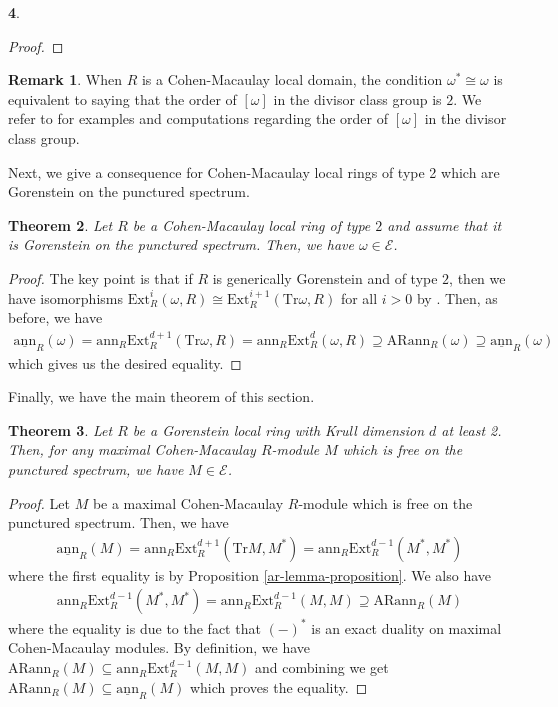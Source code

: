 \documentclass[12pt]{amsart}
\newcommand{\Ext}{\mathrm{Ext}}
\newcommand{\ann}{\mathrm{ann}}
\newcommand{\sann}{\underline{\mathrm{ann}}}
\newcommand{\arann}{\mathrm{ARann}}
\newcommand{\EE}{\mathcal{E}}
\newtheorem{theorem}{Theorem}[section]
\theoremstyle{definition}
\newtheorem{remark}[theorem]{Remark}
\newtheorem{chunk}[theorem]{}
\numberwithin{equation}{theorem}
\newcommand{\Tr}{\mathrm{Tr}}
\begin{document}
\begin{chunk}
\begin{proof}
\end{proof}
\begin{remark}
    When $R$ is a Cohen-Macaulay local domain, the condition $\omega^* \cong \omega$ is equivalent to saying that the order of $[\omega]$ in the divisor class group is $2$. We refer to \cite{Weston} for examples and computations regarding the order of $[\omega]$ in the divisor class group.
\end{remark}
Next, we give a consequence for Cohen-Macaulay local rings of type 2 which are Gorenstein on the punctured spectrum.
\begin{theorem}\label{type-2-theorem}
    Let $R$ be a Cohen-Macaulay local ring of type $2$ and assume that it is Gorenstein on the punctured spectrum. Then, we have $\omega \in \EE$.
\end{theorem}
\begin{proof}
    The key point is that if $R$ is generically Gorenstein and of type $2$, then we have isomorphisms $\Ext_R^i(\omega, R) \cong \Ext_R^{i+1}(\Tr \omega, R)$ for all $i > 0$ by \cite[Lemma 4.1]{Dao-Kobayashi-Takahashi}. Then, as before, we have
    \begin{align*}
        \sann_R(\omega) = \ann_R\Ext_R^{d+1}(\Tr \omega, R) = \ann_R \Ext_R^d(\omega, R) \supseteq \arann_R(\omega) \supseteq \sann_R(\omega) 
    \end{align*}
    which gives us the desired equality.
\end{proof}
Finally, we have the main theorem of this section.
\begin{theorem}
    Let $R$ be a Gorenstein local ring with Krull dimension $d$ at least 2. Then, for any maximal Cohen-Macaulay $R$-module $M$ which is free on the punctured spectrum, we have $M \in \EE$.
\end{theorem}
\begin{proof}
    Let $M$ be a maximal Cohen-Macaulay $R$-module which is free on the punctured spectrum. Then, we have 
    \begin{align*}
        \sann_R(M) = \ann_R \Ext_R^{d+1}(\Tr M, M^*) = \ann_R \Ext_R^{d-1}(M^*,M^*)
    \end{align*}
    where the first equality is by Proposition \ref{ar-lemma-proposition}. We also have 
    \begin{align*}
        \ann_R \Ext_R^{d-1}(M^*,M^*) = \ann_R \Ext_R^{d-1}(M,M) \supseteq \arann_R(M)
    \end{align*}
     where the equality is due to the fact that $(-)^*$ is an exact duality on maximal Cohen-Macaulay modules. By definition, we have $\arann_R(M) \subseteq \ann_R\Ext_R^{d-1}(M,M)$ and combining we get $\arann_R(M) \subseteq \sann_R(M)$ which proves the equality.

\end{proof}
\end{chunk}
\end{document}

